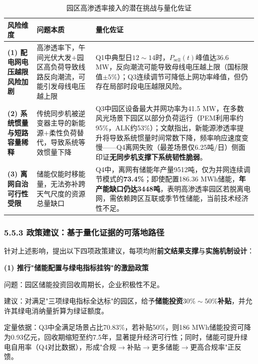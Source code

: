\documentclass[zihao=-4,a4paper]{ctexart} %
\begin{document}
	\begin{table}[ht]
		\centering
		\small
		\caption{园区高渗透率接入的潜在挑战与量化佐证}
		\label{tab:q5_negative}
		\begin{tabular}{p{28mm}p{48mm}p{60mm}}
			\toprule
			风险维度 & 问题本质 & 量化佐证 \\
			\midrule
			\textbf{(1) 配电网电压越限风险加剧} & 高渗透率下，午间光伏大发$+$园区高负荷导致线路反向潮流，可能引发母线电压越上限 & Q1中典型日$12\sim14$时，$P_{\text{sell}}(t)$峰值达36.6 MW，反向潮流可能导致母线电压越上限（国标限值$\pm5\%$）；Q3连续调节可降低上网功率峰值，但仍存在局部时段电压越限风险。 \\
			\midrule
			\textbf{(2) 系统惯量与短路容量稀释} & 传统同步机被逆变器主导的新能源$+$柔性负荷替代，导致系统等效惯量下降 & Q3中园区设备最大并网功率为41.5 MW，在多数风光场景下园区以部分负荷运行（PEM利用率约95\%，ALK约53\%）；文献\cite{2}指出，新能源渗透率提升将导致系统惯量时间常数下降，频率响应速度变慢——Q4离网失败（最差场景仅6.25吨/日）侧面印证\textbf{无同步机支撑下系统韧性脆弱}。 \\
			\midrule
			\textbf{(3) 离网自治可行性受限} & 储能仅能时移能量，无法弥补跨天气尺度的资源总量缺口 & Q4中，离网有储能年产量9512吨，仅为并网连续调节模式的\textbf{73.4\%}；即使配置186.36 MWh储能，\textbf{年产能缺口仍达3448吨}，表明高渗透率园区若脱离电网，需依赖跨区互联或季节性储能，当前技术经济性不足。 \\
			\bottomrule
		\end{tabular}
	\end{table}
	
	\subsubsection*{5.5.3 政策建议：基于量化证据的可落地路径}
	
	针对上述影响，提出以下四项政策建议，每项均附\textbf{前文结果支撑}与\textbf{实施机制设计}：
	
	
	\textbf{(1) 推行"储能配置与绿电指标挂钩"的激励政策}
	
	\par\quad 问题：园区储能投资回收周期长，企业积极性不足。
	
	\par\quad 建议：对满足"三项绿电指标全达标"的园区，给予\textbf{储能投资$30\%\sim50\%$补贴}，并允许其绿电消纳量折算为绿证额度\cite{3}。
	
	\par\quad 定量依据：Q3中全满足场景占比70.83\%，若补贴50\%，则186 MWh储能投资可降为0.93亿元，回收期缩短至约7.5年，显著提升经济可行性；同时，储能可提升绿电自用率（Q4对比数据），形成"合规$\to$补贴$\to$更多储能$\to$更高合规率"正反馈。
	
\end{document}
